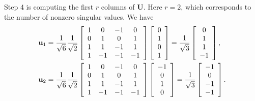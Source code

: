 Step 4 is computing the first $r$ columns of $\mathbf{U}$. Here $r = 2$, which corresponds to the number of nonzero singular values. We have
\begin{subequations}
\begin{align}
  \mathbf{u}_1 &= \frac{1}{\sqrt{6}} \frac{1}{\sqrt{2}} 
  \left[ \begin{array}{c c c c}
   1 &  0 & -1 &  0 \\
   0 &  1 &  0 &  1 \\
   1 &  1 & -1 &  1 \\
   1 & -1 & -1 & -1 \\ \end{array} \right] 
  \left[ \begin{array}{c}  0 \\  1 \\  0 \\  1 \\ \end{array} \right] =
  \frac{1}{ \sqrt{3} } \left[ \begin{array}{c} 0 \\  1  \\  1 \\ -1 \\ \end{array} \right] , \\
  \mathbf{u}_2 &= \frac{1}{\sqrt{6}} \frac{1}{\sqrt{2}} 
  \left[ \begin{array}{c c c c}
   1 &  0 & -1 &  0 \\
   0 &  1 &  0 &  1 \\
   1 &  1 & -1 &  1 \\
   1 & -1 & -1 & -1 \\ \end{array} \right] 
  \left[ \begin{array}{c} -1 \\  0 \\  1 \\  0 \\ \end{array} \right] =
  \frac{1}{ \sqrt{3} } \left[ \begin{array}{c} -1 \\  0  \\ -1 \\ -1 \\ \end{array} \right] .
\end{align}
\end{subequations}


